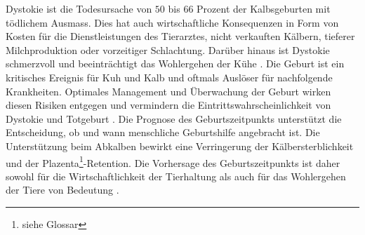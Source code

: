 Dystokie ist die Todesursache von $50$ bis $66$ Prozent der Kalbsgeburten mit tödlichem Ausmass. Dies hat auch wirtschaftliche Konsequenzen in Form von Kosten für die Dienstleistungen des Tierarztes, nicht verkauften Kälbern, tieferer Milchproduktion oder vorzeitiger Schlachtung. Darüber hinaus ist Dystokie schmerzvoll und beeinträchtigt das Wohlergehen der Kühe \citep[S. 1]{Saint-Dizier2015}. Die Geburt ist ein kritisches Ereignis für Kuh und Kalb und oftmals Auslöser für nachfolgende Krankheiten. Optimales Management und Überwachung der Geburt wirken diesen Risiken entgegen und vermindern die Eintrittswahrscheinlichkeit von Dystokie und Totgeburt \citep[S. 1]{Lange2017}. Die Prognose des Geburtszeitpunkts unterstützt die Entscheidung, ob und wann menschliche Geburtshilfe angebracht ist. Die Unterstützung beim Abkalben bewirkt eine Verringerung der Kälbersterblichkeit und der \gls{Plazenta}\footnote{\label{glossar-plazenta}siehe Glossar}-\gls{Retention}. Die Vorhersage des Geburtszeitpunkts ist daher sowohl für die Wirtschaftlichkeit der Tierhaltung als auch für das Wohlergehen der Tiere von Bedeutung \citep[S. 1]{Saint-Dizier2015}.  


